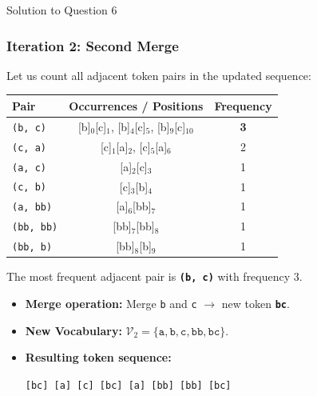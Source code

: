 \documentclass[11pt,a4paper]{article}
\begin{document}
\begin{solutionbox}{Solution to Question 6}
\subsubsection*{Iteration 2: Second Merge}
Let us count all adjacent token pairs in the updated sequence:
\begin{center}
\begin{tabular}{lcc}
\toprule
\textbf{Pair} & \textbf{Occurrences / Positions} & \textbf{Frequency} \\
\midrule
\texttt{(b, c)} & [b]$_0$[c]$_1$, [b]$_4$[c]$_5$, [b]$_9$[c]$_{10}$ & \textbf{3} \\
\texttt{(c, a)} & [c]$_1$[a]$_2$, [c]$_5$[a]$_6$ & 2 \\
\texttt{(a, c)} & [a]$_2$[c]$_3$ & 1 \\
\texttt{(c, b)} & [c]$_3$[b]$_4$ & 1 \\
\texttt{(a, bb)} & [a]$_6$[bb]$_7$ & 1 \\
\texttt{(bb, bb)} & [bb]$_7$[bb]$_8$ & 1 \\
\texttt{(bb, b)} & [bb]$_8$[b]$_9$ & 1 \\
\bottomrule
\end{tabular}
\end{center}
The most frequent adjacent pair is \texttt{\textbf{(b, c)}} with frequency $3$.
\begin{itemize}
    \item \textbf{Merge operation:} Merge \texttt{b} and \texttt{c} $\longrightarrow$ new token \texttt{\textbf{bc}}.
    \item \textbf{New Vocabulary:} $\mathcal{V}_2 = \{\texttt{a}, \texttt{b}, \texttt{c}, \texttt{bb}, \texttt{bc}\}$.
    \item \textbf{Resulting token sequence:}
    \begin{center}
    \texttt{[bc] [a] [c] [bc] [a] [bb] [bb] [bc]}
    \end{center}
\end{itemize}


\end{solutionbox}
\end{document}
